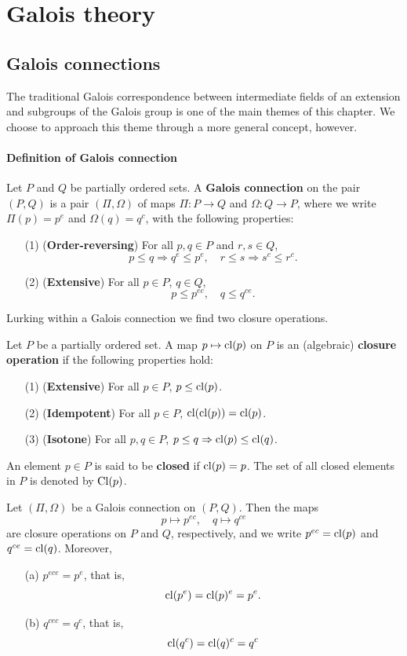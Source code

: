 \section{Galois theory}
\subsection{Galois connections}
The traditional Galois correspondence between intermediate fields of an
extension and subgroups of the Galois group is one of the main themes of this chapter. We choose to approach this theme through a more general concept, however.
\paragraph{Definition of Galois connection}
\begin{definition}
Let $P$ and $Q$ be partially ordered sets. A \textbf{Galois connection} on the pair $(P,Q)$ is a pair $(\Pi,\Omega)$ of maps $\Pi:P\to Q$ and $\Omega:Q\to P$, where we write $\Pi(p)=p^e$ and $\Omega(q)=q^c$, with the following properties:
\begin{itemize}
\item[(1)] (\textbf{Order-reversing}) For all $p,q\in P$ and $r,s\in Q$,
\[p\leq q\Rightarrow q^e\leq p^e,\quad r\leq s\Rightarrow s^c\leq r^c.\] 
\item[(2)] (\textbf{Extensive}) For all $p\in P$, $q\in Q$,
\[p\leq p^{ec},\quad q\leq q^{ce}.\] 
\end{itemize}
\end{definition}
Lurking within a Galois connection we find two closure operations.
\begin{definition}
Let $P$ be a partially ordered set. A map $p\mapsto\mathrm{cl}(p)$ on $P$ is an (algebraic) \textbf{closure operation} if the following properties hold:
\begin{itemize}
\item[(1)] (\textbf{Extensive}) For all $p\in P$, $p\leq\mathrm{cl}(p)$.
\item[(2)] (\textbf{Idempotent}) For all $p\in P$, $\mathrm{cl}(\mathrm{cl}(p))=\mathrm{cl}(p)$.
\item[(3)] (\textbf{Isotone}) For all $p,q\in P$, $p\leq q\Rightarrow\mathrm{cl}(p)\leq\mathrm{cl}(q)$.
\end{itemize}
An element $p\in P$ is said to be \textbf{closed} if $\mathrm{cl}(p)=p$. The set of all closed elements in $P$ is denoted by $\mathrm{Cl}(p)$.
\end{definition}
\begin{theorem}
Let $(\Pi,\Omega)$ be a Galois connection on $(P,Q)$. Then the maps
\[p\mapsto p^{ec},\quad q\mapsto q^{ce}\]
are closure operations on $P$ and $Q$, respectively, and we write $p^{ec}=\mathrm{cl}(p)$ and $q^{ce}=\mathrm{cl}(q)$. Moreover,
\begin{itemize}
\item[(a)] $p^{ece}=p^e$, that is,
\[\mathrm{cl}(p^e)=\mathrm{cl}(p)^e=p^e.\]
\item[(b)] $q^{cec}=q^{c}$, that is,
\[\mathrm{cl}(q^c)=\mathrm{cl}(q)^c=q^c\]  
\end{itemize}
\end{theorem}
